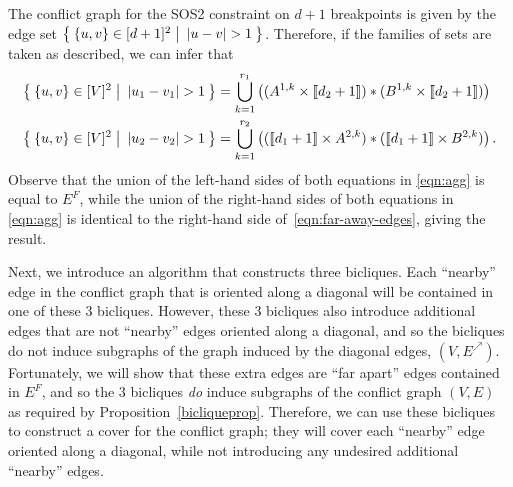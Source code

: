 \documentclass[opre,nonblindrev]{informs3} %
\begin{document}
{
The conflict graph for the SOS2 constraint on $d+1$ breakpoints is given by the edge set $\Set{ \{u,v\} \in [d+1]^2 |\: |u-v| > 1}$. Therefore, if the families of sets are taken as described, we can infer that
\begin{subequations} \label{eqn:agg}
\begin{align}
    \Set{\{u,v\} \in [V]^2 |\: |u_1-v_1| > 1} &= \bigcup_{k=1}^{r_1} \left((A^{1,k} \times \llbracket d_2 + 1 \rrbracket) * (B^{1,k} \times \llbracket d_2 + 1 \rrbracket)\right) \\
    \Set{\{u,v\} \in [V]^2 |\: |u_2-v_2| > 1} &= \bigcup_{k=1}^{r_2} \left((\llbracket d_1 + 1 \rrbracket \times A^{2,k}) * (\llbracket d_1 + 1 \rrbracket \times B^{2,k})\right).
\end{align}
\end{subequations}
Observe that the union of the left-hand sides of both equations in \eqref{eqn:agg} is equal to $E^F$, while the union of the right-hand sides of both equations in \eqref{eqn:agg} is identical to the right-hand side of~\eqref{eqn:far-away-edges}, giving the result.
\Halmos\endproof

Next, we introduce an algorithm that constructs three bicliques. Each ``nearby'' edge in the conflict graph that is oriented along a diagonal will be contained in one of these 3 bicliques. However, these 3 bicliques also introduce additional edges that are not ``nearby'' edges oriented along a diagonal, and so the bicliques do not induce subgraphs of the graph induced by the diagonal edges, $(V,E^\nearrow)$. Fortunately, we will show that these extra edges are ``far apart'' edges contained in $E^F$, and so the 3 bicliques \emph{do} induce subgraphs of the conflict graph $(V,E)$ as required by Proposition~\ref{bicliqueprop}. Therefore, we can use these bicliques to construct a cover for the conflict graph; they will cover each ``nearby'' edge oriented along a diagonal, while not introducing any undesired additional ``nearby'' edges.


}
\end{document}
